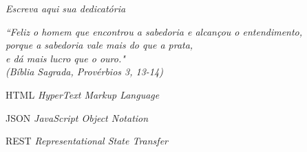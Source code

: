 \documentclass[
	12pt,				%
	oneside,
	a4paper,			%
	chapter=TITLE,
	english,			%
	brazil,				%
	]{abntex2}
\begin{document}

\frenchspacing 

\pretextual

\imprimircapa

\imprimirfolhaderosto



\begin{dedicatoria}
	\vspace*{\fill}
	\centering
	\noindent
	\textit{Escreva aqui sua dedicatória}
	 \vspace*{\fill}
\end{dedicatoria}



\begin{epigrafe}
	\vspace*{\fill}
	\begin{flushright}
		\textit{``Feliz o homem que encontrou a sabedoria e alcançou o entendimento,\\
			porque a sabedoria vale mais do que a prata, \\
			e dá mais lucro que o ouro."\\
			(Bíblia Sagrada, Provérbios 3, 13-14)}
	\end{flushright}
\end{epigrafe}



\listoffigures*
\cleardoublepage

\listoftables*
\cleardoublepage

\begin{siglas}
\item[HTML] \textit{HyperText Markup Language}
\item[JSON] \textit{JavaScript Object Notation}
\item[REST] \textit{Representational State Transfer}
\end{siglas}
\end{document}
